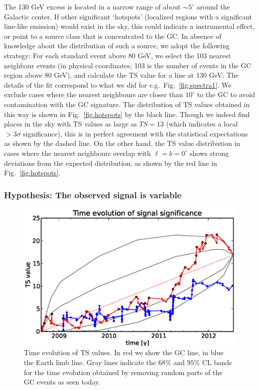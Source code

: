 \documentclass[aps,twocolumn,prd,superscriptaddress,showpacs,nofootinbib,fixfloat]{revtex4}
\begin{document}
The 130 GeV excess is located in a narrow range of about
$\sim5^\circ$ around the Galactic center. If other
significant `hotspots' (localized regions with a significant
line-like emission) would exist in the sky, this could
indicate a instrumental effect, or point to a source class
that is concentrated to the GC. In absence of knowledge
about the distribution of such a source, we adopt the
following strategy: For each standard event above 80 GeV, we
select the 103 nearest neighbour events (in physical
coordinates; 103 is the number of events in the GC region
above 80 GeV), and calculate the TS value for a line at 130
GeV. The details of the fit correspond to what we did for
e.g.~Fig.~\ref{fig:spectra1}. We exclude cases where the
nearest neighbours are closer than $10^\circ$ to the GC to
avoid contamination with the GC signature. The distribution
of TS values obtained in this way is shown in
Fig.~\ref{fig:hotspots} by the black line. Though we indeed
find places in the sky with TS values as large as $TS=13$
(which indicates a local $>3\sigma$ significance), this is
in perfect agreement with the statistical expectations as
shown by the dashed line. On the other hand, the TS value
distribution in cases where the nearest neighbours overlap
with $\ell=b=0^\circ$ shows strong deviations from the
expected distribution, as shown by the red line in
Fig.~\ref{fig:hotspots}.

\subsubsection{Hypothesis: The observed signal is variable}

\begin{figure}
  \begin{center}
    \includegraphics[width=1.0\linewidth]{plots/TS_time.eps}
  \end{center}
  \caption{Time evolution of TS values. In red we show the
  GC line, in blue the Earth limb line. Gray lines indicate
  the $68\%$ and $95\%$ CL bands for the time evolution
  obtained by removing random parts of the GC events as seen
  today.}
  \label{fig:timeevolution}
\end{figure}
\end{document}

